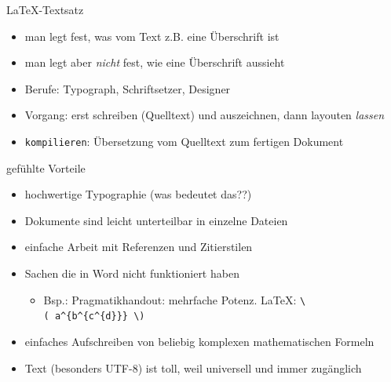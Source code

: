 \begin{frame}{\LaTeX-Textsatz}

\begin{itemize}
\itemsep1pt\parskip0pt
\item
  man legt fest, was vom Text z.B. eine Überschrift ist
\item
  man legt aber \emph{nicht} fest, wie eine Überschrift aussieht
\item
  Berufe: Typograph, Schriftsetzer, Designer
\item
  Vorgang: erst schreiben (Quelltext) und auszeichnen, dann layouten
  \emph{lassen}
\item
  \texttt{kompilieren}: Übersetzung vom Quelltext zum fertigen Dokument
\end{itemize}

\end{frame}

\begin{frame}{gefühlte Vorteile}

\begin{itemize}
\itemsep1pt\parskip0pt
\item
  hochwertige Typographie (was bedeutet das??)
\item
  Dokumente sind leicht unterteilbar in einzelne Dateien
\item
  einfache Arbeit mit Referenzen und Zitierstilen
\item
  Sachen die in Word nicht funktioniert haben

  \begin{itemize}
  \itemsep1pt\parskip0pt
  \item
    Bsp.: Pragmatikhandout: mehrfache Potenz. \LaTeX:
    \texttt{\textbackslash{}(\ a\^{}\{b\^{}\{c\^{}\{d\}\}\}\ \textbackslash{})}
  \end{itemize}
\item
  einfaches Aufschreiben von beliebig komplexen mathematischen Formeln
\item
  Text (besonders UTF-8) ist toll, weil universell und immer zugänglich
\end{itemize}

\end{frame}

